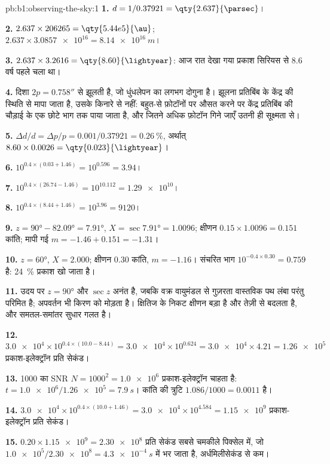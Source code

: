 \begin{solution}{pb:b1:observing-the-sky:1}
\textbf{1.} $d = 1/0.37921 = \qty{2.637}{\parsec}$।

\textbf{2.} $2.637\times206265 = \qty{5.44e5}{\au}$;
$2.637\times\num{3.0857e16} = \qty{8.14e16}{m}$।

\textbf{3.} $2.637\times3.2616 = \qty{8.60}{\lightyear}$: आज रात देखा गया प्रकाश सिरियस से 8.6 वर्ष पहले चला था।

\textbf{4.} दिशा $2p = \ang{;;0.758}$ से झूलती है, जो धुंधलेपन का लगभग दोगुना है। झूलना प्रतिबिंब के
केंद्र की स्थिति से मापा जाता है, उसके किनारे से नहीं: बहुत-से फ़ोटॉनों पर औसत करने पर केंद्र
प्रतिबिंब की चौड़ाई के एक छोटे भाग तक पाया जाता है, और जितने अधिक फ़ोटॉन गिने जाएँ उतनी ही
सूक्ष्मता से।

\textbf{5.} $\Delta d/d = \Delta p/p = 0.001/0.37921 = \qty{0.26}{\percent}$,
अर्थात् $8.60\times0.0026 = \qty{0.023}{\lightyear}$।

\textbf{6.} $10^{0.4\times(0.03 + 1.46)} = 10^{0.596} = 3.94$।

\textbf{7.} $10^{0.4\times(26.74 - 1.46)} = 10^{10.112} = \num{1.29e10}$।

\textbf{8.} $10^{0.4\times(8.44 + 1.46)} = 10^{3.96} = \num{9120}$।

\textbf{9.} $z = \ang{90} - \ang{82.09} = \ang{7.91}$, $X = \sec\ang{7.91} =
1.0096$; क्षीणन $0.15\times1.0096 = 0.151$ कांति; मापी गई
$m = -1.46 + 0.151 = -1.31$।

\textbf{10.} $z = \ang{60}$, $X = 2.000$; क्षीणन 0.30 कांति,
$m = -1.16$। संचरित भाग $10^{-0.4\times0.30} = 0.759$ है:
\qty{24}{\percent} प्रकाश खो जाता है।

\textbf{11.} उदय पर $z = \ang{90}$ और $\sec z$ अनंत है, जबकि वक्र वायुमंडल से गुज़रता वास्तविक पथ लंबा
परंतु परिमित है; अपवर्तन भी किरण को मोड़ता है। क्षितिज के निकट क्षीणन बड़ा है और तेज़ी से बदलता है,
और समतल-समांतर सुधार गलत है।

\textbf{12.} $\num{3.0e4}\times10^{0.4\times(10.0 - 8.44)} = \num{3.0e4}
\times10^{0.624} = \num{3.0e4}\times4.21 = \num{1.26e5}$ प्रकाश-इलेक्ट्रॉन प्रति सेकंड।

\textbf{13.} 1000 का SNR $N = 1000^2 = \num{1.0e6}$ प्रकाश-इलेक्ट्रॉन चाहता है:
$t = \num{1.0e6}/\num{1.26e5} = \qty{7.9}{s}$। कांति की त्रुटि $1.086/1000 = \num{0.0011}$ है।

\textbf{14.} $\num{3.0e4}\times10^{0.4\times(10.0 + 1.46)} = \num{3.0e4}
\times10^{4.584} = \num{1.15e9}$ प्रकाश-इलेक्ट्रॉन प्रति सेकंड।

\textbf{15.} $0.20\times\num{1.15e9} = \num{2.30e8}$ प्रति सेकंड सबसे चमकीले पिक्सेल में, जो
$\num{1.0e5}/\num{2.30e8} =
\qty{4.3e-4}{s}$ में भर जाता है, अर्धमिलीसेकंड से कम।


\end{solution}
